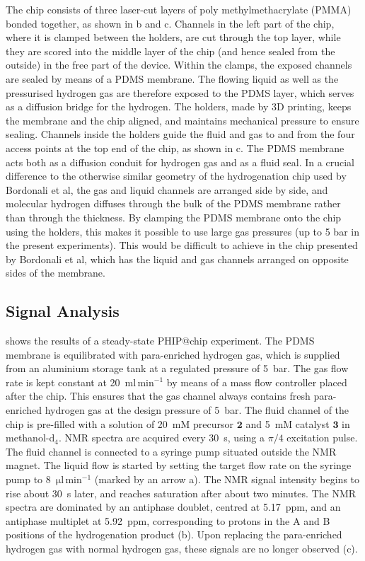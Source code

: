 The chip consists of three laser-cut layers of poly methylmethacrylate (PMMA)
bonded together, as shown in b and c. Channels in the
left part of the chip, where it is clamped between the holders, are cut through
the top layer, while they are scored into the middle layer of the chip (and
hence sealed from the outside) in the free part of the device.
Within the clamps, the exposed channels are sealed by means of a PDMS membrane.
The flowing liquid as well as
the pressurised hydrogen gas are therefore exposed to the PDMS layer,
which serves as a diffusion bridge for the hydrogen.
The holders, made by 3D printing, keeps the membrane and the chip aligned,
and maintains mechanical pressure to ensure sealing. Channels
inside the holders guide the fluid and gas to and from
the four access points at the top end
of the chip, as shown in c.
The PDMS membrane acts both as a diffusion conduit for hydrogen gas
and as a fluid seal.
In a crucial difference to the otherwise similar geometry of the
hydrogenation chip used by Bordonali et al\cite{Bordonali:2019jq},
the gas and liquid channels are arranged side by side, and molecular
hydrogen diffuses through the bulk of the PDMS membrane rather than through
the thickness. By clamping the PDMS membrane onto the chip using the
holders, this makes it possible to use large gas pressures (up to 5 bar in
the present experiments). This would be difficult to achieve in the
chip presented by Bordonali et al, which has the liquid and gas channels
arranged on opposite sides of the membrane.

\subsection{Signal Analysis}

 shows the results of a steady-state PHIP@chip experiment.
The PDMS membrane is equilibrated with para-enriched hydrogen gas, which is
supplied from an aluminium storage tank at a regulated pressure of 5~bar. The
gas flow rate is kept constant at 20~$\text{ml}\,\text{min}^{-1}$ by means of a
mass flow controller placed after the chip. This ensures that the gas channel
always contains fresh para-enriched hydrogen gas at the design pressure of
5~bar. The fluid channel of the chip is pre-filled with a solution of 20~mM
precursor $\mathbf{2}$ and 5~mM catalyst $\mathbf{3}$ in methanol-d$_4$. NMR
spectra are acquired every 30~s, using a $\pi/4$ excitation pulse.  The fluid
channel is connected to a syringe pump situated outside the NMR magnet.  The
liquid flow is started by setting the target flow rate on the syringe pump to
8~$\mathrm{\mu l\,\text{min}^{-1}}$ (marked by an arrow a).
The NMR signal intensity begins to rise about 30~s later, and reaches saturation
after about two minutes. The NMR spectra are dominated by an antiphase doublet,
centred at 5.17~ppm, and an antiphase multiplet at 5.92~ppm, corresponding to
protons in the A and B positions of the hydrogenation product
(b).  Upon replacing the para-enriched hydrogen gas with
normal hydrogen gas, these signals are no longer observed
(c).

